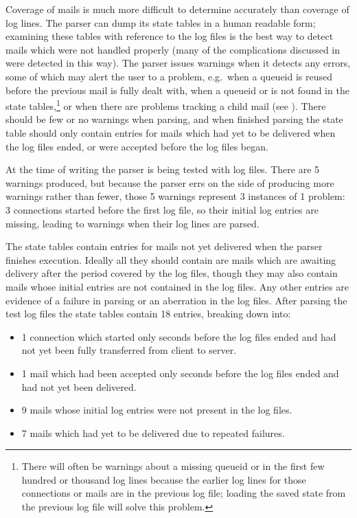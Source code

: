 \label{mails-covered}

Coverage of mails is much more difficult to determine accurately than
coverage of log lines.  The parser can dump its state tables in a human
readable form; examining these tables with reference to the log files is
the best way to detect mails which were not handled properly (many of the
complications discussed in  were
detected in this way).  The parser issues warnings when it detects any
errors, some of which may alert the user to a problem, e.g.\ when a queueid
is reused before the previous mail is fully dealt with, when a queueid or
\pid{} is not found in the state tables,\footnote{There will often be
warnings about a missing queueid or \pid{} in the first few hundred or
thousand log lines because the earlier log lines for those connections or
mails are in the previous log file; loading the saved state from the
previous log file will solve this problem.} or when there are problems
tracking a child mail (see ).  There
should be few or no warnings when parsing, and when finished parsing the
state table should only contain entries for mails which had yet to be
delivered when the log files ended, or were accepted before the log files
began.

At the time of writing the parser is being tested with \numberOFlogFILES{}
log files.  There are 5 warnings produced, but because the parser errs on
the side of producing more warnings rather than fewer, those 5 warnings
represent 3 instances of 1 problem: 3 connections started before the first
log file, so their initial log entries are missing, leading to warnings
when their log lines are parsed.

The state tables contain entries for mails not yet delivered when the
parser finishes execution.  Ideally all they should contain are mails which
are awaiting delivery after the period covered by the log files, though
they may also contain mails whose initial entries are not contained in the
log files.  Any other entries are evidence of a failure in parsing or an
aberration in the log files.  After parsing the \numberOFlogFILES{} test
log files the state tables contain 18 entries, breaking down into:

\begin{itemize}

    \item 1 connection which started only seconds before the log files
        ended and had not yet been fully transferred from client to server.

    \item 1 mail which had been accepted only seconds before the log files
        ended and had not yet been delivered.

    \item 9 mails whose initial log entries were not present in the log
        files.

    \item 7 mails which had yet to be delivered due to repeated failures.

\end{itemize}

